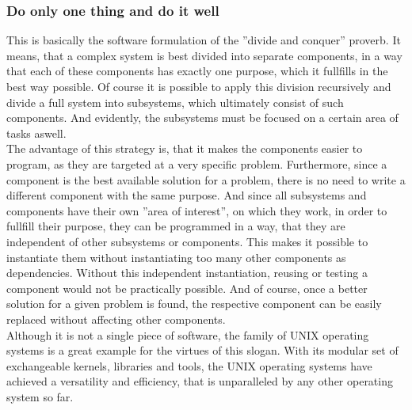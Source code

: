 		\subsubsection{Do only one thing and do it well}
			\label{OneThing}
			This is basically the software formulation of the ''divide and conquer'' proverb.
			It means, that a complex system is best divided into separate components, in a way that each of these components has exactly one purpose, which it fullfills in the best way possible.
			Of course it is possible to apply this division recursively and divide a full system into subsystems, which ultimately consist of such components.
			And evidently, the subsystems must be focused on a certain area of tasks aswell.\\
			The advantage of this strategy is, that it makes the components easier to program, as they are targeted at a very specific problem.
			Furthermore, since a component is the best available solution for a problem, there is no need to write a different component with the same purpose.
			And since all subsystems and components have their own ''area of interest'', on which they work, in order to fullfill their purpose, they can be programmed in a way, that they are independent of other subsystems or components.
			This makes it possible to instantiate them without instantiating too many other components as dependencies.
			Without this independent instantiation, reusing or testing a component would not be practically possible.
			And of course, once a better solution for a given problem is found, the respective component can be easily replaced without affecting other components.\\
			Although it is not a single piece of software, the family of UNIX operating systems is a great example for the virtues of this slogan.
			With its modular set of exchangeable kernels, libraries and tools, the UNIX operating systems have achieved a versatility and efficiency, that is unparalleled by any other operating system so far.

